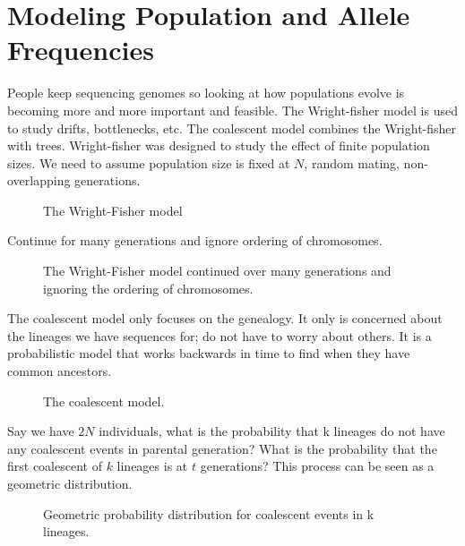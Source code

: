 \section{Modeling Population and Allele Frequencies}
People keep sequencing genomes so looking at how populations evolve is
becoming more and more important and feasible. The Wright-fisher model
is used to study drifts, bottlenecks, etc. The coalescent model
combines the Wright-fisher with trees. Wright-fisher was designed to
study the effect of finite population sizes. We need to assume
population size is fixed at $N$, random mating, non-overlapping
generations.

\begin{figure} [ht!] 
  \centering 
  \caption{The Wright-Fisher model}
  \label{Fig13_FisherWrightModel}
\end{figure} 

\noindent Continue for many generations and ignore ordering of chromosomes.

\begin{figure} [ht!] 
  \centering 
  \caption{The Wright-Fisher model continued over many generations and
    ignoring the ordering of chromosomes.}
  \label{Fig14_FisherWrightManyGenerations}
\end{figure} 

The coalescent model only focuses on the genealogy. It only is
concerned about the lineages we have sequences for; do not have to
worry about others. It is a probabilistic model that works backwards
in time to find when they have common ancestors.

\begin{figure} [ht!] 
  \centering 
  \caption{The coalescent model.}
  \label{Fig15_CoalescentModel}
\end{figure} 

Say we have $2N$ individuals, what is the probability that k lineages
do not have any coalescent events in parental generation? What is the
probability that the first coalescent of $k$ lineages is at $t$
generations? This process can be seen as a geometric distribution.

\begin{figure} [ht!] 
  \centering 
  \caption{Geometric probability distribution for coalescent events in k lineages.}
  \label{Fig16_CoalescentProbDist}
\end{figure} 

